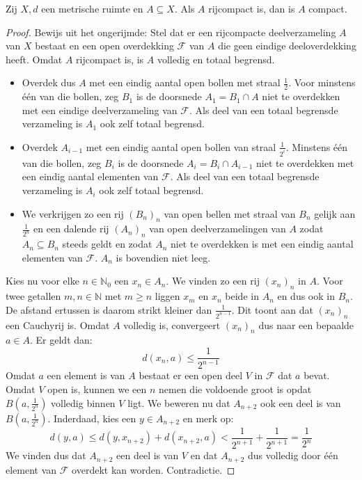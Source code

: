 \documentclass[main.tex]{subfiles}
\begin{document}
\begin{bst}
  \label{st:rijcompact-dan-compact}
  Zij $X,d$ een metrische ruimte en $A \subseteq X$.
  Als $A$ rijcompact is, dan is $A$ compact.

  \begin{proof}
    Bewijs uit het ongerijmde:
    Stel dat er een rijcompacte deelverzameling $A$ van $X$ bestaat en een open overdekking $\mathcal{F}$ van $A$ die geen eindige deeloverdekking heeft.
    Omdat $A$ rijcompact is, is $A$ volledig en totaal begrensd.
    \begin{itemize}
    \item 
      Overdek dus $A$ met een eindig aantal open bollen met straal $\frac{1}{2}$.
      Voor minstens \'e\'en van die bollen, zeg $B_{1}$ is de doorsnede $A_{1} = B_{1} \cap A$ niet te overdekken met een eindige deelverzameling van $\mathcal{F}$.
      Als deel van een totaal begrensde verzameling is $A_{1}$ ook zelf totaal begrensd.
    \item 
      Overdek $A_{i-1}$ met een eindig aantal open bollen van straal $\frac{1}{2^{i}}$.
      Minstens \'e\'en van die bollen, zeg $B_{i}$ is de doorsnede $A_{i} = B_{i} \cap A_{i-1}$ niet te overdekken met een eindig aantal elementen van $\mathcal{F}$.
      Als deel van een totaal begrensde verzameling is $A_{i}$ ook zelf totaal begrensd.
    \item
      We verkrijgen zo een rij $(B_{n})_{n}$ van open bellen met straal van $B_{n}$ gelijk aan $\frac{1}{2^{n}}$ en een dalende rij $(A_{n})_{n}$ van open deelverzamelingen van $A$ zodat $A_{n} \subseteq B_{n}$ steeds geldt en zodat $A_{n}$ niet te overdekken is met een eindig aantal elementen van $\mathcal{F}$.
      $A_{n}$ is bovendien niet leeg.
    \end{itemize}
    Kies nu voor elke $n\in \mathbb{N}_{0}$ een $x_{n}\in A_{n}$.
    We vinden zo een rij $(x_{n})_{n}$ in $A$.
    Voor twee getallen $m,n\in\mathbb{N}$ met $m\ge n$ liggen $x_{m}$ en $x_{n}$ beide in $A_{n}$ en dus ook in $B_{n}$.
    De afstand ertussen is daarom strikt kleiner dan $\frac{1}{2^{n-1}}$.
    Dit toont aan dat $(x_{n})_{n}$ een Cauchyrij is.
    Omdat $A$ volledig is, convergeert $(x_{n})_{n}$ dus naar een bepaalde $a\in A$.
    Er geldt dan:
    \[ d(x_{n},a) \le \frac{1}{2^{n-1}} \]
    Omdat $a$ een element is van $A$ bestaat er een open deel $V$ in $\mathcal{F}$ dat $a$ bevat.
    Omdat $V$ open is, kunnen we een $n$ nemen die voldoende groot is opdat $B\left(a,\frac{1}{2^{n}}\right)$ volledig binnen $V$ ligt.
    We beweren nu dat $A_{n+2}$ ook een deel is van $B\left(a,\frac{1}{2^{n}}\right)$.
    Inderdaad, kies een $y\in A_{n+2}$ en merk op:
    \[ d(y,a) \le d(y,x_{n+2}) + d(x_{n+2},a) < \frac{1}{2^{n+1}} + \frac{1}{2^{n+1}} = \frac{1}{2^{n}} \]
    We vinden dus dat $A_{n+2}$ een deel is van $V$ en dat $A_{n+2}$ dus volledig door \'e\'en element van $\mathcal{F}$ overdekt kan worden.
    Contradictie.
  \end{proof}
\end{bst}
\end{document}
